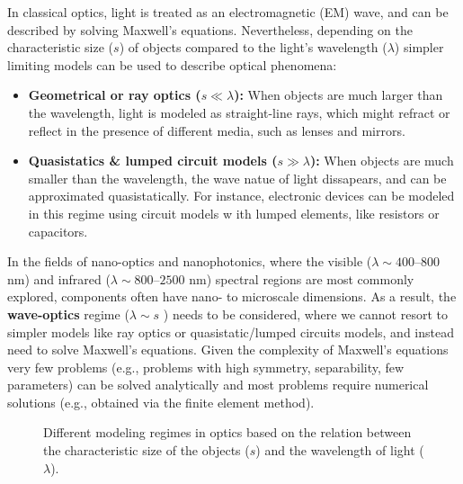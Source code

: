 In classical optics, light is treated as an electromagnetic (EM) wave, and can
be described by
solving Maxwell's equations. Nevertheless,
depending on the characteristic size ($s$) of objects compared to the light's
wavelength ($\lambda$)
simpler limiting models can be used to describe optical phenomena:
\begin{itemize}
    \item \textbf{Geometrical or ray optics ($s \ll \lambda$):} When objects
          are much larger than the wavelength, light is modeled as straight-line rays,
          which might refract or reflect in the presence of different media, such as
          lenses and mirrors.
    \item \textbf{Quasistatics \& lumped circuit models ($s \gg \lambda$):}
          When objects are much smaller than the wavelength, the wave natue of light
          dissapears,
          and can be approximated quasistatically. For instance, electronic devices
          can be modeled in this regime using circuit models w
          ith lumped elements, like resistors or capacitors.
\end{itemize}
In the fields of nano-optics and nanophotonics, where the visible
(\(\lambda \sim 400\)--\(800\) nm) and infrared (\(\lambda \sim 800\)--\(2500\)
nm)
spectral regions are most commonly explored, components often have nano- to
microscale dimensions. As a result, the \textbf{wave-optics} regime ($\lambda
    \sim s$ ) needs to be considered,
where we cannot resort to simpler models like ray optics or
quasistatic/lumped circuits models,
and instead need to solve Maxwell's equations. Given the complexity of
Maxwell's
equations very few problems (e.g., problems with high symmetry, separability,
few parameters)
can be solved analytically and most problems require
numerical solutions (e.g., obtained via the finite element method).

\begin{figure}[tb]
    \centering

    \caption{Different modeling regimes in optics based on the
        relation between the characteristic size of the objects ($s$) and the
        wavelength of light ($\lambda$).}
    \label{fig:EM_regime}
\end{figure}

